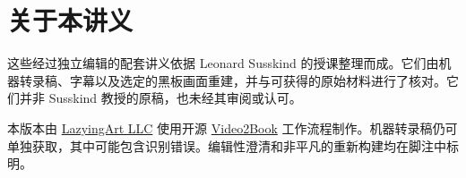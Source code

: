 \documentclass[11pt,oneside]{book}
\begin{document}
\frontmatter
\hypersetup{pageanchor=false}

\hypersetup{pageanchor=true}

\clearpage
\chapter*{关于本讲义}
这些经过独立编辑的配套讲义依据 Leonard Susskind 的授课整理而成。它们由机器转录稿、字幕以及选定的黑板画面重建，并与可获得的原始材料进行了核对。它们并非 Susskind 教授的原稿，也未经其审阅或认可。

本版本由 \href{https://lazying.art}{LazyingArt LLC} 使用开源 \href{https://github.com/lachlanchen/Video2Book}{Video2Book} 工作流程制作。机器转录稿仍可单独获取，其中可能包含识别错误。编辑性澄清和非平凡的重新构建均在脚注中标明。
\clearpage
\tableofcontents
\mainmatter










\end{document}
